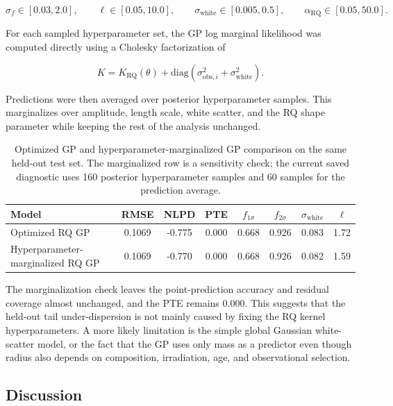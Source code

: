 \documentclass{article}
\numberwithin{equation}{section}
\begin{document}
\begin{equation}
\sigma_f \in [0.03,2.0], \qquad
\ell \in [0.05,10.0], \qquad
\sigma_{\mathrm{white}} \in [0.005,0.5], \qquad
\alpha_{\mathrm{RQ}} \in [0.05,50.0].
\end{equation}

For each sampled hyperparameter set, the GP log marginal likelihood was computed directly using a Cholesky factorization of

\begin{equation}
K =
K_{\mathrm{RQ}}(\theta)
+
\mathrm{diag}\left(\sigma_{\mathrm{obs},i}^2+\sigma_{\mathrm{white}}^2\right).
\end{equation}

Predictions were then averaged over posterior hyperparameter samples. This marginalizes over amplitude, length scale, white scatter, and the RQ shape parameter while keeping the rest of the analysis unchanged.

\begin{table}[H]
\centering
\caption{Optimized GP and hyperparameter-marginalized GP comparison on the same held-out test set. The marginalized row is a sensitivity check; the current saved diagnostic uses 160 posterior hyperparameter samples and 60 samples for the prediction average.}
\label{tab:gp-hyperparameter-sampling}
\begin{tabular}{lccccccc}
\toprule
Model & RMSE & NLPD & PTE & $f_{1\sigma}$ & $f_{2\sigma}$ & $\sigma_{\mathrm{white}}$ & $\ell$ \\
\midrule
Optimized RQ GP & 0.1069 & -0.775 & 0.000 & 0.668 & 0.926 & 0.083 & 1.72 \\
Hyperparameter-marginalized RQ GP & 0.1069 & -0.770 & 0.000 & 0.668 & 0.926 & 0.082 & 1.59 \\
\bottomrule
\end{tabular}
\end{table}

The marginalization check leaves the point-prediction accuracy and residual coverage almost unchanged, and the PTE remains 0.000. This suggests that the held-out tail under-dispersion is not mainly caused by fixing the RQ kernel hyperparameters. A more likely limitation is the simple global Gaussian white-scatter model, or the fact that the GP uses only mass as a predictor even though radius also depends on composition, irradiation, age, and observational selection.

\subsection{Discussion}
\end{document}
